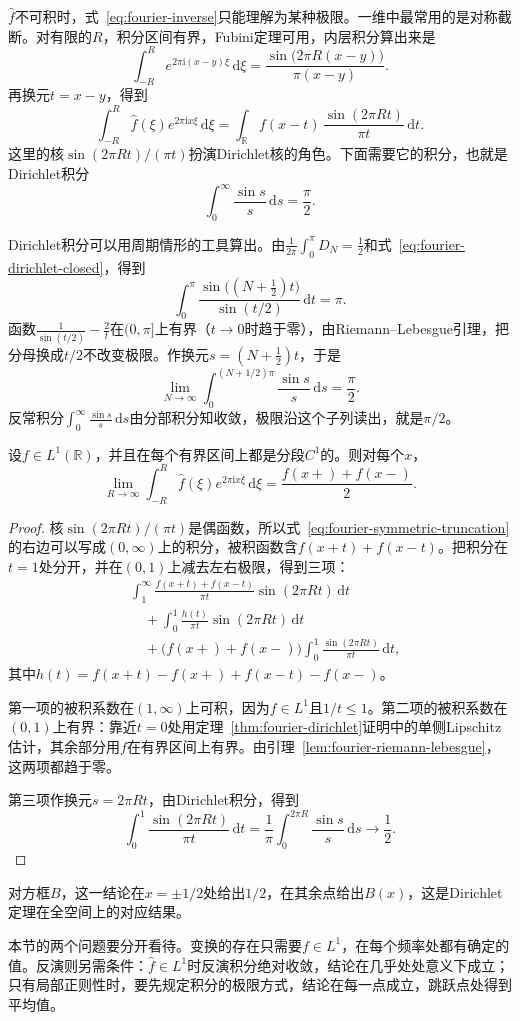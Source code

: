 $\widehat f$不可积时，式~\eqref{eq:fourier-inverse}只能理解为某种极限。一维中最常用的是对称截断。对有限的$R$，积分区间有界，Fubini定理可用，内层积分算出来是
\[
\int_{-R}^{R}e^{2\pi\mathrm i(x-y)\xi}\,\mathrm d\xi=\frac{\sin\bigl(2\pi R(x-y)\bigr)}{\pi(x-y)}.
\]
再换元$t=x-y$，得到
\begin{equation}
\int_{-R}^{R}\widehat f(\xi)e^{2\pi\mathrm ix\xi}\,\mathrm d\xi=\int_{\mathbb R}f(x-t)\,\frac{\sin(2\pi Rt)}{\pi t}\,\mathrm dt .
\label{eq:fourier-symmetric-truncation}
\end{equation}
这里的核$\sin(2\pi Rt)/(\pi t)$扮演Dirichlet核的角色。下面需要它的积分，也就是Dirichlet积分
\[
\int_0^\infty\frac{\sin s}{s}\,\mathrm ds=\frac\pi2.
\]

Dirichlet积分可以用周期情形的工具算出。由$\frac1{2\pi}\int_0^\pi D_N=\frac12$和式~\eqref{eq:fourier-dirichlet-closed}，得到
\[
\int_0^\pi\frac{\sin\bigl((N+\tfrac12)t\bigr)}{\sin(t/2)}\,\mathrm dt=\pi.
\]
函数$\frac1{\sin(t/2)}-\frac2t$在$(0,\pi]$上有界（$t\to0$时趋于零），由Riemann--Lebesgue引理，把分母换成$t/2$不改变极限。作换元$s=(N+\tfrac12)t$，于是
\[
\lim_{N\to\infty}\int_0^{(N+1/2)\pi}\frac{\sin s}{s}\,\mathrm ds=\frac\pi2.
\]
反常积分$\int_0^\infty\frac{\sin s}{s}\,\mathrm ds$由分部积分知收敛，极限沿这个子列读出，就是$\pi/2$。

\begin{theorem}[对称截断的逐点反演]
\label{thm:fourier-symmetric-inversion}
设$f\in L^1(\mathbb R)$，并且在每个有界区间上都是分段$C^1$的。则对每个$x$，
\begin{equation}
\lim_{R\to\infty}\int_{-R}^{R}\widehat f(\xi)e^{2\pi\mathrm ix\xi}\,\mathrm d\xi=\frac{f(x+)+f(x-)}2 .
\label{eq:fourier-symmetric-inversion}
\end{equation}
\end{theorem}

\begin{proof}
核$\sin(2\pi Rt)/(\pi t)$是偶函数，所以式~\eqref{eq:fourier-symmetric-truncation}的右边可以写成$(0,\infty)$上的积分，被积函数含$f(x+t)+f(x-t)$。把积分在$t=1$处分开，并在$(0,1)$上减去左右极限，得到三项：
\[
\begin{aligned}
&\int_1^\infty\frac{f(x+t)+f(x-t)}{\pi t}\sin(2\pi Rt)\,\mathrm dt\\
&\quad+\int_0^1\frac{h(t)}{\pi t}\sin(2\pi Rt)\,\mathrm dt\\
&\quad+\bigl(f(x+)+f(x-)\bigr)\int_0^1\frac{\sin(2\pi Rt)}{\pi t}\,\mathrm dt,
\end{aligned}
\]
其中$h(t)=f(x+t)-f(x+)+f(x-t)-f(x-)$。

第一项的被积系数在$(1,\infty)$上可积，因为$f\in L^1$且$1/t\leq1$。第二项的被积系数在$(0,1)$上有界：靠近$t=0$处用定理~\ref{thm:fourier-dirichlet}证明中的单侧Lipschitz估计，其余部分用$f$在有界区间上有界。由引理~\ref{lem:fourier-riemann-lebesgue}，这两项都趋于零。

第三项作换元$s=2\pi Rt$，由Dirichlet积分，得到
\[
\int_0^1\frac{\sin(2\pi Rt)}{\pi t}\,\mathrm dt=\frac1\pi\int_0^{2\pi R}\frac{\sin s}{s}\,\mathrm ds\to\frac12.
\]
\end{proof}

对方框$B$，这一结论在$x=\pm1/2$处给出$1/2$，在其余点给出$B(x)$，这是Dirichlet定理在全空间上的对应结果。

本节的两个问题要分开看待。变换的存在只需要$f\in L^1$，在每个频率处都有确定的值。反演则另需条件：$\widehat f\in L^1$时反演积分绝对收敛，结论在几乎处处意义下成立；只有局部正则性时，要先规定积分的极限方式，结论在每一点成立，跳跃点处得到平均值。
